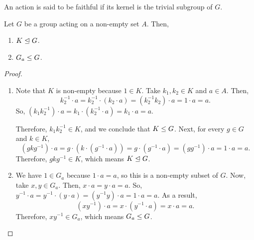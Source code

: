 \documentclass[11pt]{penrose}
\begin{document}
\begin{ndfn}
    An action is said to be faithful if its kernel is the trivial subgroup of $G$.
\end{ndfn}

\begin{nprop}
    Let $G$ be a group acting on a non-empty set $A$. Then,
    \begin{enumerate}
        \item $K \mathrel{\trianglelefteq} G$.
        \item $G_{a} \mathrel{\leq} G$.
    \end{enumerate}
\end{nprop}
\begin{proof}
    \phantom{.}
    \begin{enumerate}
        \item Note that $K$ is non-empty because $1 \in K$. Take $k_{1}, k_{2} \in K$ and $a \in A$. Then,
        \begin{equation*}
            k_{2}^{-1} \cdot a
            = k_{2}^{-1} \cdot (k_{2} \cdot a)
            = (k_{2}^{-1} k_{2}) \cdot a
            = 1 \cdot a
            = a.
        \end{equation*}
        So, $(k_{1}k_{2}^{-1}) \cdot a = k_{1} \cdot (k_{2}^{-1} \cdot a) = k_{1} \cdot a = a$.

        Therefore, $k_{1} k_{2}^{-1} \in K$, and we conclude that $K \mathrel{\leq} G$. Next, for every $g \in G$ and $k \in K$,
        \begin{equation*}
            (gkg^{-1}) \cdot a
            = g \cdot (k \cdot (g^{-1} \cdot a))
            = g \cdot (g^{-1} \cdot a)
            = (gg^{-1}) \cdot a
            = 1 \cdot a
            = a.
        \end{equation*}
        Therefore, $gkg^{-1} \in K$, which means $K \mathrel{\trianglelefteq} G$.

        \item We have $1 \in G_{a}$ because $1 \cdot a = a$, so this is a non-empty subset of $G$. Now, take $x, y \in G_{a}$. Then, $x \cdot a = y \cdot a = a$. So, $y^{-1} \cdot a = y^{-1} \cdot (y \cdot a) = (y^{-1} y) \cdot a = 1 \cdot a = a$. As a result,
        \begin{equation*}
            (x y^{-1}) \cdot a = x \cdot (y^{-1} \cdot a) = x \cdot a = a.
        \end{equation*}
        Therefore, $x y^{-1} \in G_{a}$, which means $G_{a} \mathrel{\leq} G$.
        \qedhere
    \end{enumerate}
\end{proof}
\end{document}
